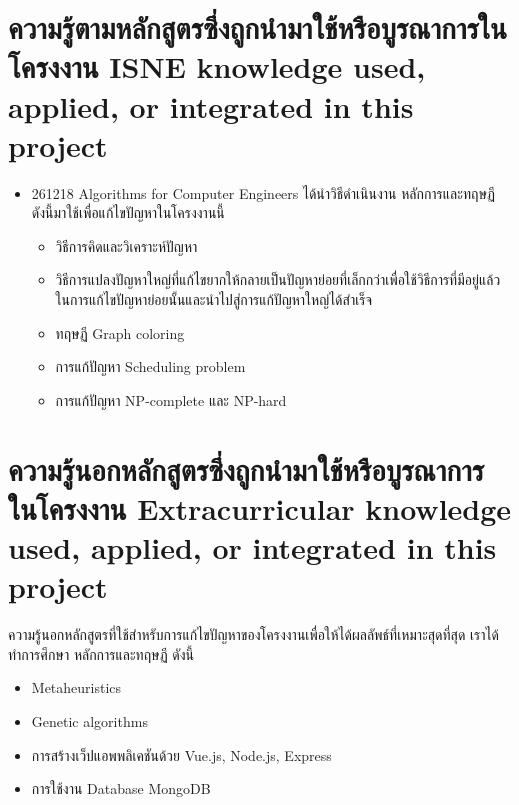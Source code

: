 \section{\ifcpe%
ความรู้ตามหลักสูตรซึ่งถูกนำมาใช้หรือบูรณาการในโครงงาน
\else%
ISNE knowledge used, applied, or integrated in this project
\fi
}
\begin{itemize}
  \item 261218 Algorithms for Computer Engineers ได้นำวิธีดำเนินงาน หลักการและทฤษฏี ดังนี้มาใช้เพื่อแก้ไขปัญหาในโครงงานนี้  
  \begin{itemize}
  \item วิธีการคิดและวิเคราะห์ปัญหา
  \item วิธีการแปลงปัญหาใหญ่ที่แก้ไขยากให้กลายเป็นปัญหาย่อยที่เล็กกว่าเพื่อใช้วิธีการที่มีอยู่แล้วในการแก้ไขปัญหาย่อยนั้นและนำไปสู่การแก้ปัญหาใหญ่ได้สำเร็จ
  \item ทฤษฏี Graph coloring
  \item การแก้ปัญหา Scheduling problem
  \item การแก้ปัญหา NP-complete และ NP-hard
  \end{itemize}
\end{itemize}

\section{\ifcpe%
ความรู้นอกหลักสูตรซึ่งถูกนำมาใช้หรือบูรณาการในโครงงาน
\else%
Extracurricular knowledge used, applied, or integrated in this project
\fi
}
ความรู้นอกหลักสูตรที่ใช้สำหรับการแก้ไขปัญหาของโครงงานเพื่อให้ได้ผลลัพธ์ที่เหมาะสุดที่สุด เราได้ทำการศึกษา หลักการและทฤษฏี ดังนี้
\begin{itemize}
  \item Meta­heuristics
  \item Genetic algorithms
  \item การสร้างเว็ปแอพพลิเคชันด้วย Vue.js, Node.js, Express
  \item การใช้งาน Database MongoDB
\end{itemize}
